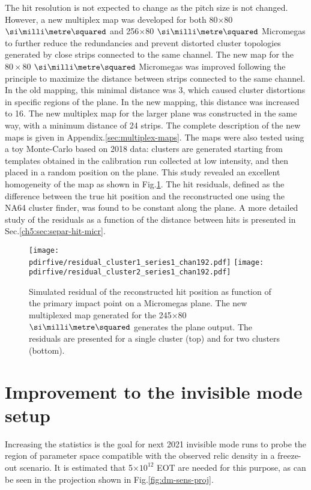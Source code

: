 The hit resolution is not expected to change as the pitch size is not changed. However, a new multiplex map was developed for both 80$\times$80 $\mms$ and 256$\times$80 $\mms$ Micromegas to further reduce the redundancies and prevent distorted cluster topologies generated by close strips connected to the same channel. The new map for the $80\times80$ $\mms$ Micromegas was improved following the principle to maximize the distance between strips connected to the same channel. In the old mapping, this minimal distance was 3, which caused cluster distortions in specific regions of the plane. In the new mapping, this distance was increased to 16. The new multiplex map for the larger plane was constructed in the same way, with a minimum distance of 24 strips. The complete description of the new maps is given in Appendix.\ref{sec:multiplex-maps}. The maps were also tested using a toy Monte-Carlo based on 2018 data: clusters are generated starting from templates obtained in the calibration run collected at low intensity, and then placed in a random position on the plane. This study revealed an excellent homogeneity of the map as shown in Fig.\ref{fig:mm-mult-study}. The hit residuals, defined as the difference between the true hit position and the reconstructed one using the NA64 cluster finder, was found to be constant along the plane. A more detailed study of the residuals as a function of the distance between hits is presented in Sec.\ref{ch5:sec:separ-hit-micr}.

\begin{figure}
    \centering
    \texttt{[image: \\pdirfive/residual\_cluster1\_series1\_chan192.pdf]}
    \texttt{[image: \\pdirfive/residual\_cluster2\_series1\_chan192.pdf]}
    \caption[Test of new multiplex map]{Simulated residual of the reconstructed hit position as function of the primary impact point on a Micromegas plane. The new multiplexed map generated for the 245$\times$80 $\mms$ generates the plane output. The residuals are presented for a single cluster (top) and for two clusters (bottom).}
    \label{fig:mm-mult-study}
\end{figure}


\FloatBarrier\noindent
\section{Improvement to the invisible mode setup}
\label{ch5:sec:new-invismode-setup}

Increasing the statistics is the goal for next 2021 invisible mode runs to probe the region of parameter space compatible with the observed relic density in a freeze-out scenario. It is estimated that 5$\times 10^{12}$ EOT are needed for this purpose, as can be seen in the projection shown in Fig.\ref{fig:dm-sens-proj}.

